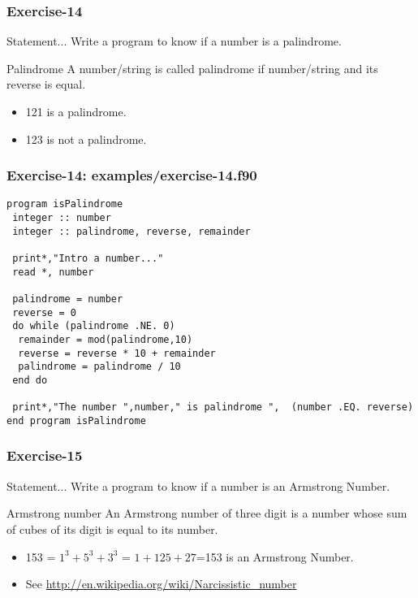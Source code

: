 \documentclass[xcolor=dvipsnames,dvip,notes=show,table]{beamer}
\begin{document}
\begin{frame}[fragile]
\frametitle{Exercise-14}
\begin{block}{Statement...}
 Write a program to know if a number is a palindrome.
\end{block}

\begin{exampleblock}{Palindrome}
  A number/string is called palindrome if number/string and its reverse is equal.
  \begin{itemize}
   \item 121 is a palindrome.
   \item 123 is not a palindrome.
  \end{itemize}

\end{exampleblock}


\end{frame}


\begin{frame}[fragile]
\frametitle{Exercise-14: examples/exercise-14.f90}
\scriptsize
\begin{lstlisting}
program isPalindrome
 integer :: number
 integer :: palindrome, reverse, remainder

 print*,"Intro a number..."
 read *, number

 palindrome = number
 reverse = 0
 do while (palindrome .NE. 0)
  remainder = mod(palindrome,10)
  reverse = reverse * 10 + remainder
  palindrome = palindrome / 10
 end do

 print*,"The number ",number," is palindrome ",  (number .EQ. reverse)
end program isPalindrome
\end{lstlisting}
\end{frame}



\begin{frame}[fragile]
\frametitle{Exercise-15}
\begin{block}{Statement...}
 Write a program to know if a number is an Armstrong Number.
\end{block}

\begin{exampleblock}{Armstrong number}
 An Armstrong number of three digit is a number whose sum of cubes of its digit is equal to its number. 
  \begin{itemize}
   \item  153 = $1^3+5^3+3^3$ = $1+125+27$=153 is an Armstrong Number.
   \item  See \url{http://en.wikipedia.org/wiki/Narcissistic\_number}
  \end{itemize}

\end{exampleblock}


\end{frame}
\end{document}
